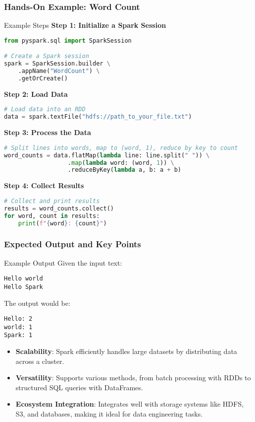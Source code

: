 \documentclass[aspectratio=169]{beamer}
\begin{document}
\begin{frame}[fragile]
  \frametitle{Hands-On Example: Word Count}
  \begin{block}{Example Steps}
    \textbf{Step 1: Initialize a Spark Session}
    \begin{lstlisting}[language=Python]
from pyspark.sql import SparkSession

# Create a Spark session
spark = SparkSession.builder \
    .appName("WordCount") \
    .getOrCreate()
    \end{lstlisting}

    \textbf{Step 2: Load Data}
    \begin{lstlisting}[language=Python]
# Load data into an RDD
data = spark.textFile("hdfs://path_to_your_file.txt")
    \end{lstlisting}

    \textbf{Step 3: Process the Data}
    \begin{lstlisting}[language=Python]
# Split lines into words, map to (word, 1), reduce by key to count
word_counts = data.flatMap(lambda line: line.split(" ")) \
                  .map(lambda word: (word, 1)) \
                  .reduceByKey(lambda a, b: a + b)
    \end{lstlisting}
    
    \textbf{Step 4: Collect Results}
    \begin{lstlisting}[language=Python]
# Collect and print results
results = word_counts.collect()
for word, count in results:
    print(f"{word}: {count}")
    \end{lstlisting}
  \end{block}
\end{frame}

\begin{frame}[fragile]
  \frametitle{Expected Output and Key Points}
  \begin{block}{Example Output}
    Given the input text:
    \begin{verbatim}
Hello world
Hello Spark
    \end{verbatim}
    The output would be:
    \begin{verbatim}
Hello: 2
world: 1
Spark: 1
    \end{verbatim}
  \end{block}

  \begin{itemize}
    \item \textbf{Scalability}: Spark efficiently handles large datasets by distributing data across a cluster.
    \item \textbf{Versatility}: Supports various methods, from batch processing with RDDs to structured SQL queries with DataFrames.
    \item \textbf{Ecosystem Integration}: Integrates well with storage systems like HDFS, S3, and databases, making it ideal for data engineering tasks.
  \end{itemize}
\end{frame}
\end{document}
